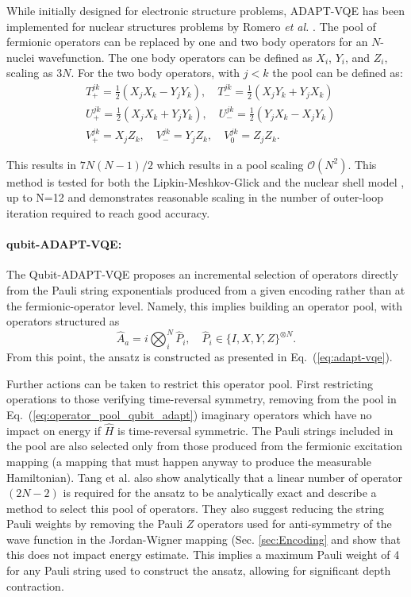 While initially designed for electronic structure problems, ADAPT-VQE has been implemented for nuclear structures problems by Romero \textit{et al.} \cite{Romero2022}. The pool of fermionic operators can be replaced by one and two body operators for an $N$-nuclei wavefunction. The one body operators can be defined as $X_i$, $Y_i$, and $Z_i$, scaling as $3N$. For the two body operators, with $j < k$ the pool can be defined as: 
\begin{align} \label{eq:operator_pool_nuclear_adapt}
    &T_{+}^{jk} = \frac{1}{2}(X_jX_k - Y_jY_k), \quad T_{-}^{jk} = \frac{1}{2}(X_jY_k + Y_jX_k)\nonumber \\
    &U_{+}^{jk} = \frac{1}{2}(X_jX_k + Y_jY_k), \quad U_{-}^{jk} = \frac{1}{2}(Y_jX_k - X_jY_k)\nonumber \\
    &V_{+}^{jk} = X_jZ_k, \quad V_{-}^{jk} = Y_jZ_k, \quad V_{0}^{jk} = Z_jZ_k.
\end{align}

This results in $7N(N - 1)/2$ which results in a pool scaling $\mathcal{O}(N^2)$. This method is tested for both the Lipkin-Meshkov-Glick \cite{Lipkin1965} and the nuclear shell model \cite{Caurier2005, Heyde1994}, up to N=12 and demonstrates reasonable scaling in the number of outer-loop iteration required to reach good accuracy.  

\paragraph{qubit-ADAPT-VQE:}

The Qubit-ADAPT-VQE \cite{Tang2021} proposes an incremental selection of operators directly from the Pauli string exponentials produced from a given encoding rather than at the fermionic-operator level. Namely, this implies building an operator pool, with operators structured as 
\begin{equation} \label{eq:operator_pool_qubit_adapt}
    \hat{A}_a = i \bigotimes_i^N \hat{P}_i, \quad \hat{P}_i \in \{I, X, Y, Z\}^{\otimes N}.
\end{equation}
From this point, the ansatz is constructed as presented in Eq.~(\ref{eq:adapt-vqe}).

Further actions can be taken to restrict this operator pool. First restricting operations to those verifying time-reversal symmetry, removing from the pool in Eq.~(\ref{eq:operator_pool_qubit_adapt}) imaginary operators which have no impact on energy if $\hat{H}$ is time-reversal symmetric. The Pauli strings included in the pool are also selected only from those produced from the fermionic excitation mapping (a mapping that must happen anyway to produce the measurable Hamiltonian). Tang et al. \cite{Tang2021} also show analytically that a linear number of operator $(2N - 2)$ is required for the ansatz to be analytically exact and describe a method to select this pool of operators. They also suggest reducing the string Pauli weights by removing the Pauli $Z$ operators used for anti-symmetry of the wave function in the Jordan-Wigner mapping (Sec. \ref{sec:Encoding} and show that this does not impact energy estimate. This implies a maximum Pauli weight of 4 for any Pauli string used to construct the ansatz, allowing for significant depth contraction.

